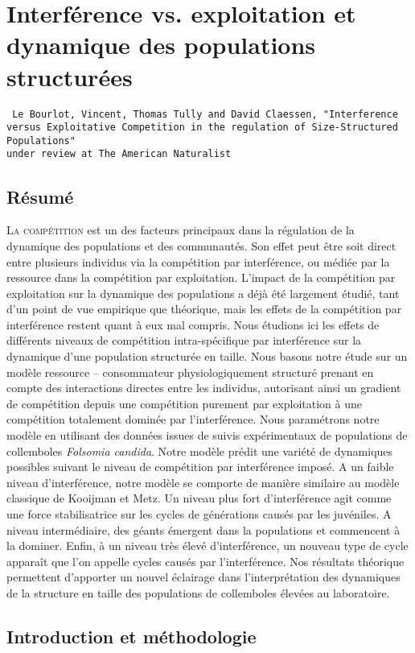 \chapter[Interférence vs. exploitation et dynamique des populations structurées][Interférence et populations structurées]{Interférence vs. exploitation et dynamique des populations structurées}

\vspace{2cm}
\begin{Spacing}{1}
\texttt{
Le Bourlot, Vincent, Thomas Tully and David Claessen, "Interference versus
Exploitative Competition in the regulation of Size-Structured Populations"\\
under review at The American Naturalist
}
\end{Spacing}

\section*{Résumé}


\lettrine[lines=3]{L}{a compétition}  est un des facteurs principaux dans la régulation de la dynamique des populations et des communautés. Son effet peut être soit direct entre plusieurs individus via la compétition par interférence, ou médiée par la ressource dans la compétition par exploitation. L'impact de la compétition par exploitation sur la dynamique des populations a déjà été largement étudié, tant d'un point de vue empirique que théorique, mais les effets de la compétition par interférence restent quant à eux mal compris. Nous étudions ici les effets de différents niveaux de compétition intra-spécifique par interférence sur la dynamique d'une population structurée en taille. Nous basons notre étude sur un modèle ressource -- consommateur physiologiquement structuré prenant en compte des interactions directes entre les individus, autorisant ainsi un gradient de compétition depuis une compétition purement par exploitation à une compétition totalement dominée par l'interférence. Nous paramétrons notre modèle en utilisant des données issues de suivis expérimentaux de populations de collemboles \textit{Folsomia candida}. Notre modèle prédit une variété de dynamiques possibles suivant le niveau de compétition par interférence imposé. A un faible niveau d'interférence, notre modèle se comporte de manière similaire au modèle classique de Kooijman et Metz. Un niveau plus fort d'interférence agit comme une force stabilisatrice sur les cycles de générations causés par les juvéniles. A niveau intermédiaire, des géants émergent dans la populations et commencent à la dominer. Enfin, à un niveau très élevé d'interférence, un nouveau type de cycle apparaît que l'on appelle cycles causés par l'interférence. Nos résultats théorique permettent d'apporter un nouvel éclairage dans l'interprétation des dynamiques de la structure en taille des populations de collemboles élevées au laboratoire.

\section{Introduction et méthodologie}

